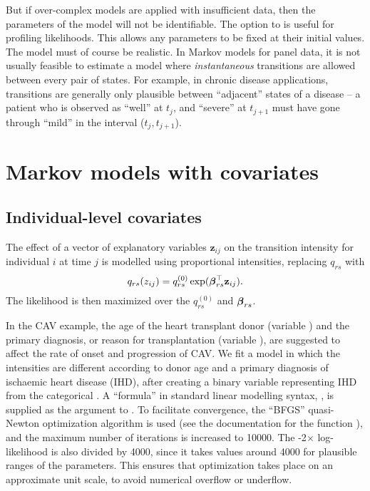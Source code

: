 \documentclass[article,shortnames]{jss}
\begin{document}
But if over-complex models are applied with insufficient data, then
the parameters of the model will not be identifiable.  The
 option to  is useful for profiling
likelihoods.  This allows any parameters to be fixed at their initial
values.  The model must of course be realistic.  In Markov models for
panel data, it is not usually feasible to estimate a model where
\emph{instantaneous} transitions are allowed between every pair of
states. For example, in chronic disease applications, transitions are
generally only plausible between ``adjacent'' states of a disease -- a
patient who is observed as ``well'' at $t_j$, and ``severe'' at
$t_{j+1}$ must have gone through ``mild'' in the interval
($t_j,t_{j+1}$).


\section{Markov models with covariates}
\label{sec:covs}

\subsection{Individual-level covariates}
\label{sec:indivcovs}

The effect of a vector of explanatory variables $\mathbf{z}_{ij}$ on the transition intensity for individual $i$ at time $j$ is
modelled using proportional intensities, replacing $q_{rs}$ with
\[q_{rs}(z_{ij}) = q_{rs}^{(0)} \exp(\mbox{\boldmath$\beta$\unboldmath}_{rs}^\top \mathbf{z}_{ij}).\]
The likelihood is then maximized over the $q_{rs}^{(0)}$ and $\mbox{\boldmath$\beta$\unboldmath}_{rs}$.

In the CAV example, the age of the heart transplant donor (variable
) and the primary diagnosis, or reason for transplantation
(variable ), are suggested to affect the rate of onset and
progression of CAV.  We fit a model in which the intensities are
different according to donor age and a primary diagnosis of ischaemic
heart disease (IHD), after creating a binary variable 
representing IHD from the categorical .  A ``formula'' in
standard  linear modelling syntax, , is
supplied as the  argument to .  To
facilitate convergence, the ``BFGS'' quasi-Newton optimization
algorithm is used (see the documentation for the  function
), and the maximum number of iterations is increased to
10000.  The -2$\times$ log-likelihood is also divided by 4000, since
it takes values around 4000 for plausible ranges of the parameters.
This ensures that optimization takes place on an approximate unit
scale, to avoid numerical overflow or underflow.
\end{document}
